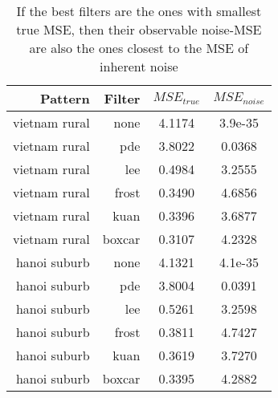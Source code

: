 \documentclass[journal]{IEEEtran}
\begin{document}
\begin{table}
\centering
\begin{tabular}{r|r|c|c}
Pattern  & Filter  & $MSE_{true}$   & $MSE_{noise}$      \\%
\hline
vietnam rural	& none		& 4.1174	& 3.9e-35\\
vietnam rural	& pde			& 3.8022	& 0.0368\\
vietnam rural	& lee			& 0.4984	& 3.2555\\
vietnam rural	& frost		& 0.3490	& 4.6856\\
vietnam rural	& kuan		& 0.3396	& 3.6877\\
vietnam rural	& boxcar	& 0.3107	& 4.2328\\
\hline
hanoi suburb	& none		& 4.1321	& 4.1e-35\\
hanoi suburb	& pde			& 3.8004	& 0.0391\\
hanoi suburb	& lee			& 0.5261	& 3.2598\\
hanoi suburb	& frost		& 0.3811	& 4.7427\\
hanoi suburb	& kuan		& 0.3619	& 3.7270\\
hanoi suburb	& boxcar	& 0.3395	& 4.2882\\
\hline
\end{tabular}

\caption{If the best filters are the ones with smallest true MSE, then their observable noise-MSE are also the ones closest to the MSE of inherent noise}
\label{tab:mse_true_noise_log_domain}
\end{table}
\end{document}
